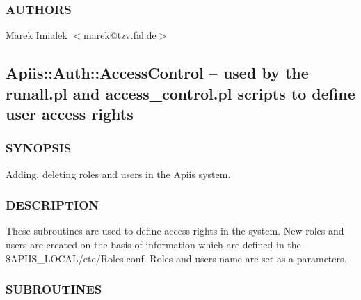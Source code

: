 \subsubsection*{AUTHORS\label{Apiis::Auth::AppAuth_--_object_for_provading_data_about_user_access_rights_for_the_applications_AUTHORS}}


Marek Imialek $<$marek@tzv.fal.de$>$

\subsection{Apiis::Auth::AccessControl -- used by the runall.pl and access\_control.pl scripts to define user access rights\label{Apiis::Auth::AccessControl_--_used_by_the_runall_pl_and_access_control_pl_scripts_to_define_user_access_rights}}




\subsubsection*{SYNOPSIS\label{Apiis::Auth::AccessControl_--_used_by_the_runall_pl_and_access_control_pl_scripts_to_define_user_access_rights_SYNOPSIS}}


Adding, deleting roles and users in the Apiis system.

\subsubsection*{DESCRIPTION\label{Apiis::Auth::AccessControl_--_used_by_the_runall_pl_and_access_control_pl_scripts_to_define_user_access_rights_DESCRIPTION}}


These subroutines are used to define access rights in the system. New roles and users are created on the basis of information
which are defined in the \$APIIS\_LOCAL/etc/Roles.conf. Roles and users name are set as a parameters.

\subsubsection*{SUBROUTINES\label{Apiis::Auth::AccessControl_--_used_by_the_runall_pl_and_access_control_pl_scripts_to_define_user_access_rights_SUBROUTINES}}
